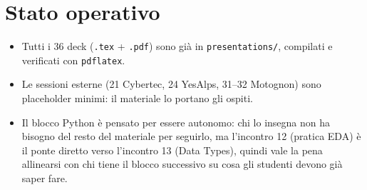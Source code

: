 \documentclass[11pt,a4paper]{article}
\begin{document}
\section{Stato operativo}
\begin{itemize}[leftmargin=1.4em]
\item Tutti i 36 deck (\texttt{.tex} + \texttt{.pdf}) sono già in \texttt{presentations/}, compilati e verificati con \texttt{pdflatex}.
\item Le sessioni esterne (21 Cybertec, 24 YesAlps, 31--32 Motognon) sono placeholder minimi: il materiale lo portano gli ospiti.
\item Il blocco Python è pensato per essere autonomo: chi lo insegna non ha bisogno del resto del materiale per seguirlo, ma l'incontro 12 (pratica EDA) è il ponte diretto verso l'incontro 13 (Data Types), quindi vale la pena allinearsi con chi tiene il blocco successivo su cosa gli studenti devono già saper fare.
\end{itemize}
\end{document}
